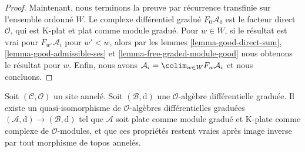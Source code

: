 \begin{proof}
\medskip\noindent
Maintenant, nous terminons la preuve par récurrence transfinie sur
l'ensemble ordonné $W$. Le complexe différentiel gradué $F_0\mathcal{A}_0$
est le facteur direct $\mathcal{O}$, qui est K-plat et plat comme module gradué.
Pour $w \in W$, si le résultat est vrai pour $F_{w'}\mathcal{A}_i$
pour $w' < w$, alors par les lemmes \ref{lemma-good-direct-sum},
\ref{lemma-good-admissible-ses} et \ref{lemma-free-graded-module-good}
nous obtenons le résultat pour $w$. Enfin, nous avons
$\mathcal{A}_i = \colim_{w \in W} F_w\mathcal{A}_i$ et
nous concluons.
\end{proof}

\begin{lemma}
\label{lemma-good-dga} Soit
$(\mathcal{C}, \mathcal{O})$ un site annelé. Soit
$(\mathcal{B}, \text{d})$ une $\mathcal{O}$-algèbre différentielle graduée. Il existe
un quasi-isomorphisme de $\mathcal{O}$-algèbres différentielles graduées
$(\mathcal{A}, \text{d}) \to (\mathcal{B}, \text{d})$ tel que
$\mathcal{A}$ soit plate comme module gradué et K-plate comme complexe de $\mathcal{O}$-modules, et que ces
propriétés restent vraies après image inverse par tout morphisme de
topos annelés.
\end{lemma}

